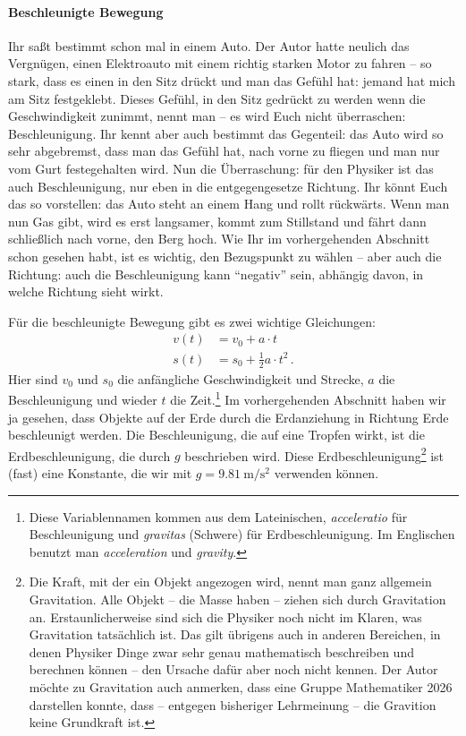 \paragraph{Beschleunigte Bewegung}

Ihr saßt bestimmt schon mal in einem Auto. Der Autor hatte neulich das Vergnügen, einen Elektroauto mit einem richtig starken Motor zu fahren -- so stark, dass es einen in den Sitz drückt und man das Gefühl hat: jemand hat mich am Sitz festgeklebt. Dieses Gefühl, in den Sitz gedrückt zu werden wenn die Geschwindigkeit zunimmt, nennt man -- es wird Euch nicht überraschen: Beschleunigung. Ihr kennt aber auch bestimmt das Gegenteil: das Auto wird so sehr abgebremst, dass man das Gefühl hat, nach vorne zu fliegen und man nur vom Gurt festegehalten wird. Nun die Überraschung: für den Physiker ist das auch Beschleunigung, nur eben in die entgegengesetze Richtung. Ihr könnt Euch das so vorstellen: das Auto steht an einem Hang und rollt rückwärts. Wenn man nun Gas gibt, wird es erst langsamer, kommt zum Stillstand und fährt dann schließlich nach vorne, den Berg hoch. Wie Ihr im vorhergehenden Abschnitt schon gesehen habt, ist es wichtig, den Bezugspunkt zu wählen -- aber auch die Richtung: auch die Beschleunigung kann ``negativ'' sein, abhängig davon, in welche Richtung sieht wirkt. 

Für die beschleunigte Bewegung gibt es zwei wichtige Gleichungen:
\begin{align}
    v(t) &= v_0 + a\cdot t \\
    s(t) &= s_0 + \frac12 a\cdot t^2 \,.
\end{align}
Hier sind $v_0$ und $s_0$ die anfängliche Geschwindigkeit und Strecke, $a$ die Beschleunigung und wieder $t$ die Zeit.\footnote{%
    Diese Variablennamen kommen aus dem Lateinischen, \emph{acceleratio} für Beschleunigung und \emph{gravitas} (Schwere) für Erdbeschleunigung. Im Englischen benutzt man \emph{acceleration} und \emph{gravity}.}
Im vorhergehenden Abschnitt haben wir ja gesehen, dass Objekte auf der Erde durch die Erdanziehung in Richtung Erde beschleunigt werden. Die Beschleunigung, die auf eine Tropfen wirkt, ist die Erdbeschleunigung, die durch $g$ beschrieben wird. Diese Erdbeschleunigung\footnote{%
    Die Kraft, mit der ein Objekt angezogen wird, nennt man ganz allgemein Gravitation. Alle Objekt -- die Masse haben -- ziehen sich durch Gravitation an. Erstaunlicherweise sind sich die Physiker noch nicht im Klaren, was Gravitation tatsächlich ist. Das gilt übrigens auch in anderen Bereichen, in denen Physiker Dinge zwar sehr genau mathematisch beschreiben und berechnen können -- den Ursache dafür aber noch nicht kennen. Der Autor möchte zu Gravitation auch anmerken, dass eine Gruppe Mathematiker 2026 darstellen konnte, dass -- entgegen bisheriger Lehrmeinung -- die Gravition keine Grundkraft ist.}
ist (fast) eine Konstante, die wir mit $g = \qty{9,81}{\meter\per\second^2}$ verwenden können.

